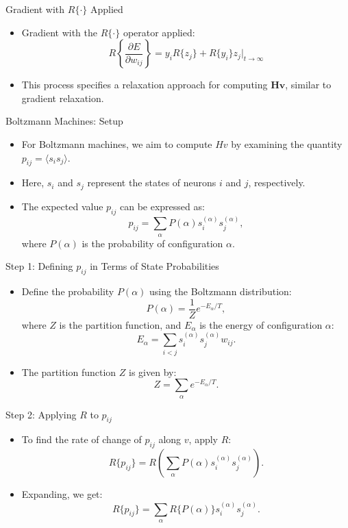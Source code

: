 \documentclass{beamer}
\begin{document}
\begin{frame}{Gradient with \( R\{\cdot\} \) Applied}
    \begin{itemize}
        \item Gradient with the \( R\{\cdot\} \) operator applied:
        \[
        R\left\{ \frac{\partial E}{\partial w_{ij}} \right\} = y_i R\{z_j\} + R\{y_i\} z_j \big|_{t \to \infty}
        \]
        \item This process specifies a relaxation approach for computing \( \mathbf{H}\mathbf{v} \), similar to gradient relaxation.
    \end{itemize}
\end{frame}


\begin{frame}{Boltzmann Machines: Setup}
    \begin{itemize}
        \item For Boltzmann machines, we aim to compute \( Hv \) by examining the quantity \( p_{ij} = \langle s_i s_j \rangle \).
        \item Here, \( s_i \) and \( s_j \) represent the states of neurons \( i \) and \( j \), respectively.
        \item The expected value \( p_{ij} \) can be expressed as:
        \[
        p_{ij} = \sum_\alpha P(\alpha) s_i^{(\alpha)} s_j^{(\alpha)},
        \]
        where \( P(\alpha) \) is the probability of configuration \( \alpha \).
    \end{itemize}
\end{frame}

\begin{frame}{Step 1: Defining \( p_{ij} \) in Terms of State Probabilities}
    \begin{itemize}
        \item Define the probability \( P(\alpha) \) using the Boltzmann distribution:
        \[
        P(\alpha) = \frac{1}{Z} e^{-E_\alpha / T},
        \]
        where \( Z \) is the partition function, and \( E_\alpha \) is the energy of configuration \( \alpha \):
        \[
        E_\alpha = \sum_{i<j} s_i^{(\alpha)} s_j^{(\alpha)} w_{ij}.
        \]
        \item The partition function \( Z \) is given by:
        \[
        Z = \sum_\alpha e^{-E_\alpha / T}.
        \]
    \end{itemize}
\end{frame}

\begin{frame}{Step 2: Applying \( R \) to \( p_{ij} \)}
    \begin{itemize}
        \item To find the rate of change of \( p_{ij} \) along \( v \), apply \( R \):
        \[
        R\{p_{ij}\} = R\left(\sum_\alpha P(\alpha) s_i^{(\alpha)} s_j^{(\alpha)}\right).
        \]
        \item Expanding, we get:
        \[
        R\{p_{ij}\} = \sum_\alpha R\{P(\alpha)\} s_i^{(\alpha)} s_j^{(\alpha)}.
        \]
    \end{itemize}
\end{frame}
\end{document}
